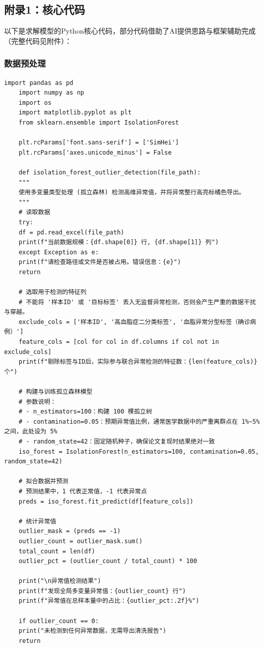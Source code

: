 \documentclass[12pt]{article}
\begin{document}
\subsection{附录1：核心代码}
\songti\small
以下是求解模型的Python核心代码，部分代码借助了AI提供思路与框架辅助完成（完整代码见附件）： 
\subsubsection{数据预处理} 
\begin{lstlisting}[caption={孤立森林异常值检测}, label={code:isolation_forest_outlier}]
	import pandas as pd
	import numpy as np
	import os
	import matplotlib.pyplot as plt
	from sklearn.ensemble import IsolationForest
	
	plt.rcParams['font.sans-serif'] = ['SimHei']
	plt.rcParams['axes.unicode_minus'] = False
	
	def isolation_forest_outlier_detection(file_path):
	"""
	使用多变量类型处理 (孤立森林) 检测高维异常值，并将异常整行高亮标橘色导出。
	"""
	# 读取数据
	try:
	df = pd.read_excel(file_path)
	print(f"当前数据规模：{df.shape[0]} 行, {df.shape[1]} 列")
	except Exception as e:
	print(f"请检查路径或文件是否被占用。错误信息：{e}")
	return
	
	# 选取用于检测的特征列
	# 不能将 '样本ID' 或 '目标标签' 丢入无监督异常检测，否则会产生严重的数据干扰与穿越。
	exclude_cols = ['样本ID', '高血脂症二分类标签', '血脂异常分型标签（确诊病例）']
	feature_cols = [col for col in df.columns if col not in exclude_cols]
	print(f"剔除标签与ID后，实际参与联合异常检测的特征数：{len(feature_cols)} 个")
	
	# 构建与训练孤立森林模型
	# 参数说明：
	# - n_estimators=100：构建 100 棵孤立树
	# - contamination=0.05：预期异常值比例，通常医学数据中的严重离群点在 1%~5% 之间，此处设为 5%
	# - random_state=42：固定随机种子，确保论文复现时结果绝对一致
	iso_forest = IsolationForest(n_estimators=100, contamination=0.05, random_state=42)
	
	# 拟合数据并预测
	# 预测结果中，1 代表正常值，-1 代表异常点
	preds = iso_forest.fit_predict(df[feature_cols])
	
	# 统计异常值
	outlier_mask = (preds == -1)
	outlier_count = outlier_mask.sum()
	total_count = len(df)
	outlier_pct = (outlier_count / total_count) * 100
	
	print("\n异常值检测结果")
	print(f"发现全局多变量异常值：{outlier_count} 行")
	print(f"异常值在总样本量中的占比：{outlier_pct:.2f}%")
	
	if outlier_count == 0:
	print("未检测到任何异常数据，无需导出清洗报告")
	return
	

\end{lstlisting}
\end{document}
